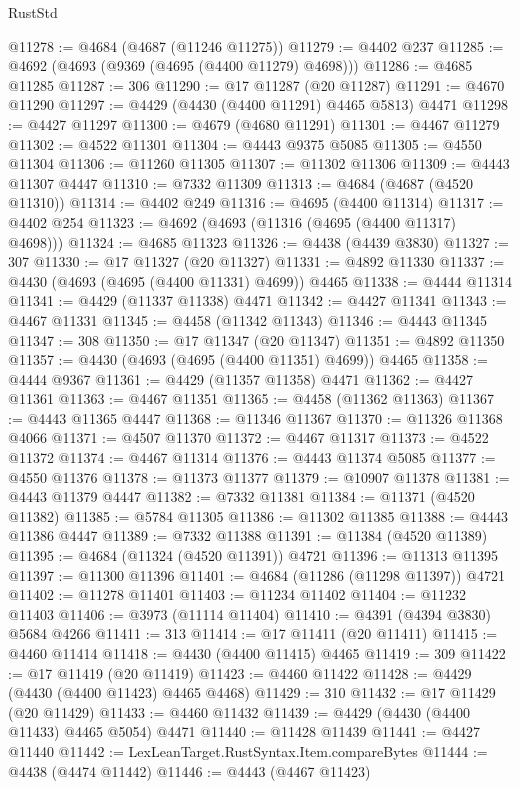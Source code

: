 \begin{lexlean}{RustStd}
\begin{coremodule}
@11278 := @4684 (@4687 (@11246 @11275))
@11279 := @4402 @237
@11285 := @4692 (@4693 (@9369 (@4695 (@4400 @11279) @4698)))
@11286 := @4685 @11285
@11287 := 306
@11290 := @17 @11287 (@20 @11287)
@11291 := @4670 @11290
@11297 := @4429 (@4430 (@4400 @11291) @4465 @5813) @4471
@11298 := @4427 @11297
@11300 := @4679 (@4680 @11291)
@11301 := @4467 @11279
@11302 := @4522 @11301
@11304 := @4443 @9375 @5085
@11305 := @4550 @11304
@11306 := @11260 @11305
@11307 := @11302 @11306
@11309 := @4443 @11307 @4447
@11310 := @7332 @11309
@11313 := @4684 (@4687 (@4520 @11310))
@11314 := @4402 @249
@11316 := @4695 (@4400 @11314)
@11317 := @4402 @254
@11323 := @4692 (@4693 (@11316 (@4695 (@4400 @11317) @4698)))
@11324 := @4685 @11323
@11326 := @4438 (@4439 @3830)
@11327 := 307
@11330 := @17 @11327 (@20 @11327)
@11331 := @4892 @11330
@11337 := @4430 (@4693 (@4695 (@4400 @11331) @4699)) @4465
@11338 := @4444 @11314
@11341 := @4429 (@11337 @11338) @4471
@11342 := @4427 @11341
@11343 := @4467 @11331
@11345 := @4458 (@11342 @11343)
@11346 := @4443 @11345
@11347 := 308
@11350 := @17 @11347 (@20 @11347)
@11351 := @4892 @11350
@11357 := @4430 (@4693 (@4695 (@4400 @11351) @4699)) @4465
@11358 := @4444 @9367
@11361 := @4429 (@11357 @11358) @4471
@11362 := @4427 @11361
@11363 := @4467 @11351
@11365 := @4458 (@11362 @11363)
@11367 := @4443 @11365 @4447
@11368 := @11346 @11367
@11370 := @11326 @11368 @4066
@11371 := @4507 @11370
@11372 := @4467 @11317
@11373 := @4522 @11372
@11374 := @4467 @11314
@11376 := @4443 @11374 @5085
@11377 := @4550 @11376
@11378 := @11373 @11377
@11379 := @10907 @11378
@11381 := @4443 @11379 @4447
@11382 := @7332 @11381
@11384 := @11371 (@4520 @11382)
@11385 := @5784 @11305
@11386 := @11302 @11385
@11388 := @4443 @11386 @4447
@11389 := @7332 @11388
@11391 := @11384 (@4520 @11389)
@11395 := @4684 (@11324 (@4520 @11391)) @4721
@11396 := @11313 @11395
@11397 := @11300 @11396
@11401 := @4684 (@11286 (@11298 @11397)) @4721
@11402 := @11278 @11401
@11403 := @11234 @11402
@11404 := @11232 @11403
@11406 := @3973 (@11114 @11404)
@11410 := @4391 (@4394 @3830) @5684 @4266
@11411 := 313
@11414 := @17 @11411 (@20 @11411)
@11415 := @4460 @11414
@11418 := @4430 (@4400 @11415) @4465
@11419 := 309
@11422 := @17 @11419 (@20 @11419)
@11423 := @4460 @11422
@11428 := @4429 (@4430 (@4400 @11423) @4465 @4468)
@11429 := 310
@11432 := @17 @11429 (@20 @11429)
@11433 := @4460 @11432
@11439 := @4429 (@4430 (@4400 @11433) @4465 @5054) @4471
@11440 := @11428 @11439
@11441 := @4427 @11440
@11442 := LexLeanTarget.RustSyntax.Item.compareBytes
@11444 := @4438 (@4474 @11442)
@11446 := @4443 (@4467 @11423)

\end{coremodule}
\end{lexlean}
